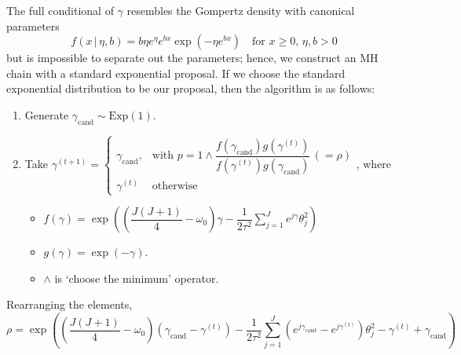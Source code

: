 \documentclass[12pt]{article}
\begin{document}
The full conditional of $\gamma$ resembles the Gompertz density with canonical parameters
\begin{equation}
  f\left(x\,|\,\eta, b\right) = b\eta e^{\eta}e^{bx}\exp\left(-\eta e^{bx}\right)\quad \text{for $x\geq 0$, $\eta, b > 0$}
\end{equation}
but is impossible to separate out the parameters; hence, we construct an MH chain with a standard exponential proposal. If we choose the standard exponential distribution to be our proposal, then the algorithm is as follows:
\begin{enumerate}
  \item Generate $\gamma_{\text{cand}} \sim \mathrm{Exp}\left(1\right)$.
  \item Take $\gamma^{\left(t+1\right)} = \begin{cases}\gamma_{\text{cand}}, & \text{with $p = 1 \wedge \dfrac{f\left(\gamma_{\text{cand}}\right)g\left(\gamma^{\left(t\right)}\right)}{f\left(\gamma^{\left(t\right)}\right)g\left(\gamma_{\text{cand}}\right)}\,(=\rho)$}\\ \gamma^{\left(t\right)} & \text{otherwise}  \end{cases}$,   where
  \begin{itemize}
    \item $f\left(\gamma\right) = \exp\left(\left(\dfrac{J\left(J+1\right)}{4}-\omega_{0}\right)\gamma - \dfrac{1}{2\tau^{2}}\displaystyle \sum_{j=1}^{J}e^{j\gamma}\theta_{j}^{2} \right) $
    \item $g\left(\gamma\right) = \exp\left(-\gamma\right)$.
    \item $\wedge$ is `choose the minimum' operator.
  \end{itemize}
\end{enumerate}
 Rearranging the elements,
 \begin{equation}
  \rho = \exp\left(\left(\frac{J\left(J+1\right)}{4}-\omega_{0}\right)\left(\gamma_{\text{cand}}-\gamma^{\left(t\right)}\right)-\frac{1}{2\tau^{2}}\sum_{j=1}^{J}\left(e^{j\gamma_{\text{cand}}}-e^{j\gamma^{\left(t\right)}}\right)\theta_{j}^{2}-\gamma^{\left(t\right)}+\gamma_{\text{cand}} \right)
 \end{equation}
\end{document}
